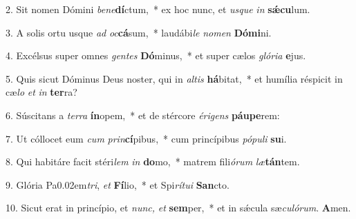 \item 2. Sit nomen Dómini \textit{be}\textit{ne}\textbf{dí}ctum,~* ex hoc nunc, et \textit{usque} \textit{in} \textbf{sǽcu}lum.
\item 3. A solis ortu usque \textit{ad} \textit{oc}\textbf{cá}sum,~* laudábi\textit{le} \textit{nomen} \textbf{Dómi}ni.
\item 4. Excélsus super omnes \textit{gentes} \textbf{Dó}minus,~* et super cælos \textit{glória} \textbf{e}jus.
\item 5. Quis sicut Dóminus Deus noster, qui in \textit{altis} \textbf{há}bitat,~* et humília réspicit in cæ\hspace{0.03em}\textit{lo} \textit{et} \textit{in} \textbf{ter}ra?
\item 6. Súscitans a \textit{terra} \textbf{ín}opem,~* et de stércore \textit{érigens} \textbf{páu}\textbf{pe}rem:
\item 7. Ut cóllocet eum \textit{cum} \textit{prin}\textbf{cí}pibus,~* cum princípibus \textit{pópuli} \textbf{su}i.
\item 8. Qui habitáre facit stéri\textit{lem} \textit{in} \textbf{do}mo,~* matrem fili\textit{órum} \textit{læ}\textbf{tán}tem.
\item 9. Glória Pa\kern0.02em\textit{tri}, \textit{et} \textbf{Fí}lio,~* et Spi\textit{rítui} \textbf{San}cto.
\item 10. Sicut erat in princípio, et \textit{nunc,} \textit{et} \textbf{sem}per,~* et in sǽcula sæ\hspace{0.03em}\textit{culórum}. \textbf{A}men.
